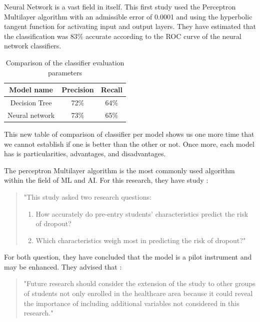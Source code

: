\documentclass[conference]{IEEEtran}
\begin{document}
Neural Network is a vast field in itself. This first study used the Perceptron Multilayer algorithm with an admissible error of 0.0001 and using the hyperbolic tangent function for activating input and output layers\cite{viloria_integration_2019}. They have estimated that the classification was 83\% accurate according to the ROC curve of the neural network classifiers.
\begin{table}[H]
    \centering
    \caption{Comparison of the classifier evaluation parameters\cite{viloria_integration_2019}}
    \begin{tabular}{|c|c|c|}
        \hline
        \textbf{Model name} & \textbf{Precision}  & \textbf{Recall}\\
        \hline
        Decision Tree & 72\% & 64\% \\
        \hline
        Neural network & 73\% & 65\% \\
        \hline
    \end{tabular}
    \label{tab:comparaison_classifier_eval_param_viloria}
\end{table}

This new table of comparison of classifier per model shows us one more time that we cannot establish if one is better than the other or not. Once more, each model has is particularities, advantages, and disadvantages. 

The perceptron Multilayer algorithm is the most commonly used algorithm within the field of ML and AI.\cite{siri_predicting_2015} For this research, they have study :
\begin{quote}
    "This study asked two research questions: 
    \begin{enumerate}
        \item How accurately do pre-entry students’ characteristics predict the risk of dropout?
        \item Which characteristics weigh most in predicting the risk of dropout?"
    \end{enumerate} 
\end{quote}\cite{siri_predicting_2015}
For both question, they have concluded that the model is a pilot instrument and may be enhanced. They advised that :
\begin{quote}
    "Future research should consider the extension of the study to other groups of students not only enrolled in the healthcare area because it could reveal the importance of including additional variables not considered in this research."
\end{quote}\cite{siri_predicting_2015}
\end{document}
